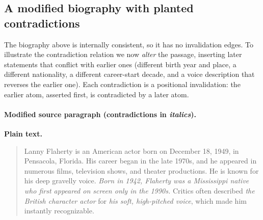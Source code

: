 \documentclass[11pt]{article}
\begin{document}
\begin{center}
\end{center}

\subsection*{A modified biography with planted contradictions}

The biography above is internally consistent, so it has no invalidation edges.
To illustrate the contradiction relation we now \emph{alter} the passage,
inserting later statements that conflict with earlier ones (different birth year
and place, a different nationality, a different career-start decade, and a voice
description that reverses the earlier one). Each contradiction is a positional
invalidation: the earlier atom, asserted first, is contradicted by a later atom.

\paragraph{Modified source paragraph (contradictions in \emph{italics}).}

\noindent\textbf{Plain text.}
\begin{quote}
Lanny Flaherty is an American actor born on December 18, 1949, in Pensacola,
Florida. His career began in the late 1970s, and he appeared in numerous films,
television shows, and theater productions. He is known for his deep gravelly
voice. \emph{Born in 1942, Flaherty was a Mississippi native who first appeared
on screen only in the 1990s.} Critics often described \emph{the British
character actor} for \emph{his soft, high-pitched voice}, which made him
instantly recognizable.
\end{quote}
\end{document}
